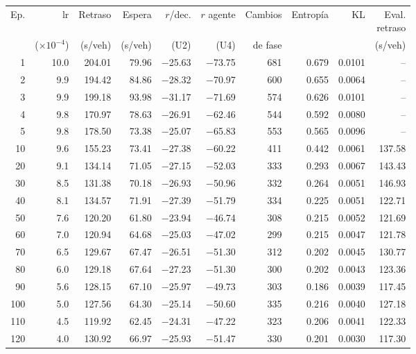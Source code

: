 \begin{table}[H]
\centering
\scriptsize
\setlength{\tabcolsep}{3pt}
\setlength{\tabcolsep}{2pt}
\begin{tabular}{rrrrrrrrrr}
\toprule
Ep. & lr & Retraso & Espera & $r$/dec. & $r$ agente & Cambios & Entropía & KL & \makecell{Eval.\\retraso} \\
 & ($\times 10^{-4}$) & (s/veh) & (s/veh) & (U2) & (U4) & de fase &  &  & (s/veh) \\
\midrule
1 & 10.0 & 204.01 & 79.96 & $-$25.63 & $-$73.75 & 681 & 0.679 & 0.0101 & -- \\
2 & 9.9 & 194.42 & 84.86 & $-$28.32 & $-$70.97 & 600 & 0.655 & 0.0064 & -- \\
3 & 9.9 & 199.18 & 93.98 & $-$31.17 & $-$71.69 & 574 & 0.626 & 0.0101 & -- \\
4 & 9.8 & 170.97 & 78.63 & $-$26.91 & $-$62.46 & 544 & 0.592 & 0.0080 & -- \\
5 & 9.8 & 178.50 & 73.38 & $-$25.07 & $-$65.83 & 553 & 0.565 & 0.0096 & -- \\
10 & 9.6 & 155.23 & 73.41 & $-$27.38 & $-$60.22 & 411 & 0.442 & 0.0061 & 137.58 \\
20 & 9.1 & 134.14 & 71.05 & $-$27.15 & $-$52.03 & 333 & 0.293 & 0.0067 & 143.43 \\
30 & 8.5 & 131.38 & 70.18 & $-$26.93 & $-$50.96 & 332 & 0.264 & 0.0051 & 146.93 \\
40 & 8.1 & 134.57 & 71.91 & $-$27.39 & $-$51.79 & 334 & 0.225 & 0.0051 & 122.71 \\
50 & 7.6 & 120.20 & 61.80 & $-$23.94 & $-$46.74 & 308 & 0.215 & 0.0052 & 121.69 \\
60 & 7.0 & 120.94 & 64.68 & $-$25.03 & $-$47.02 & 299 & 0.215 & 0.0047 & 121.78 \\
70 & 6.5 & 129.67 & 67.47 & $-$26.51 & $-$51.30 & 312 & 0.202 & 0.0045 & 130.77 \\
80 & 6.0 & 129.18 & 67.64 & $-$27.23 & $-$51.30 & 300 & 0.202 & 0.0043 & 123.36 \\
90 & 5.6 & 128.15 & 67.10 & $-$25.97 & $-$49.73 & 303 & 0.186 & 0.0039 & 117.45 \\
100 & 5.0 & 127.56 & 64.30 & $-$25.14 & $-$50.60 & 335 & 0.216 & 0.0040 & 127.18 \\
110 & 4.5 & 119.92 & 62.45 & $-$24.31 & $-$47.22 & 323 & 0.206 & 0.0041 & 122.33 \\
120 & 4.0 & 130.92 & 66.97 & $-$25.93 & $-$51.47 & 330 & 0.201 & 0.0030 & 117.30 \\

\end{tabular}
\end{table}
